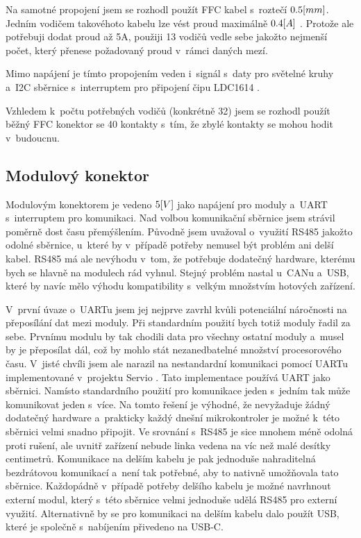 Na samotné propojení jsem se rozhodl použít FFC kabel s~roztečí \(0.5\-[mm]\).
Jedním vodičem takovéhoto kabelu lze vést proud maximálně \(0.4\-[A]\) \cite{FFC-konektor}.
Protože ale potřebuji dodat proud až 5A, použiji 13 vodičů vedle sebe jakožto nejmenší počet, který přenese požadovaný proud v~rámci daných mezí.

Mimo napájení je tímto propojením veden i~signál s~daty pro světelné kruhy a~I2C sběrnice s~interruptem pro připojení čipu LDC1614 \cite{LDC1614}.

Vzhledem k~počtu potřebných vodičů (konkrétně 32) jsem se rozhodl použít běžný FFC konektor se 40 kontakty s~tím, že zbylé kontakty se mohou hodit v~budoucnu.

\subsection{Modulový konektor \label{sec:ModulovyKonektor}}
Modulovým konektorem je vedeno \(5\-[V]\) jako napájení pro moduly a~UART s~interruptem pro komunikaci.
Nad volbou komunikační sběrnice jsem strávil poměrně dost času přemýšlením.
Původně jsem uvažoval o~využití RS485 jakožto odolné sběrnice, u~které by v~případě potřeby nemusel být problém ani delší kabel.
RS485 má ale nevýhodu v~tom, že potřebuje dodatečný hardware, kterému bych se hlavně na modulech rád vyhnul.
Stejný problém nastal u~CANu a~USB, které by navíc mělo výhodu kompatibility s~velkým množstvím hotových zařízení.

V~první úvaze o~UARTu jsem jej nejprve zavrhl kvůli potenciální náročnosti na přeposílání dat mezi moduly.
Při standardním použití bych totiž moduly řadil za sebe.
Prvnímu modulu by tak chodili data pro všechny ostatní moduly a~musel by je přeposílat dál, což by mohlo stát nezanedbatelné množství procesorového času.
V~jisté chvíli jsem ale narazil na nestandardní komunikaci pomocí UARTu implementované v~projektu Servio \cite{Servio}.
Tato implementace používá UART jako sběrnici.
Namísto standardního použití pro komunikace jeden s~jedním tak může komunikovat jeden s~více.
Na tomto řešení je výhodné, že nevyžaduje žádný dodatečný hardware a~prakticky každý dnešní mikrokontroler je možné k~této sběrnici velmi snadno připojit.
Ve srovnání s~RS485 je sice mnohem méně odolná proti rušení, ale uvnitř zařízení nebude linka vedena na víc než malé desítky centimetrů.
Komunikace na delším kabelu je pak jednoduše nahraditelná bezdrátovou komunikací a~není tak potřebné, aby to nativně umožňovala tato sběrnice.
Každopádně v~případě potřeby delšího kabelu je možné navrhnout externí modul, který s~této sběrnice velmi jednoduše udělá RS485 pro externí využití.
Alternativně by se pro komunikaci na delším kabelu dalo použít USB, které je společně s~nabíjením přivedeno na USB-C.

